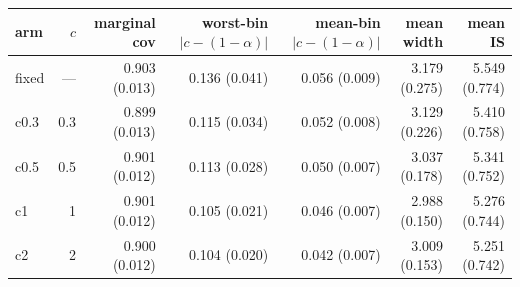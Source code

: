 \begin{tabular}{lrrrrrr}
\toprule
arm & $c$ & marginal cov & worst-bin $|c-(1-\alpha)|$ & mean-bin $|c-(1-\alpha)|$ & mean width & mean IS \\
\midrule
fixed & --- & 0.903 (0.013) & 0.136 (0.041) & 0.056 (0.009) & 3.179 (0.275) & 5.549 (0.774) \\
c0.3 & 0.3 & 0.899 (0.013) & 0.115 (0.034) & 0.052 (0.008) & 3.129 (0.226) & 5.410 (0.758) \\
c0.5 & 0.5 & 0.901 (0.012) & 0.113 (0.028) & 0.050 (0.007) & 3.037 (0.178) & 5.341 (0.752) \\
c1 & 1 & 0.901 (0.012) & 0.105 (0.021) & 0.046 (0.007) & 2.988 (0.150) & 5.276 (0.744) \\
c2 & 2 & 0.900 (0.012) & 0.104 (0.020) & 0.042 (0.007) & 3.009 (0.153) & 5.251 (0.742) \\
\bottomrule
\end{tabular}
